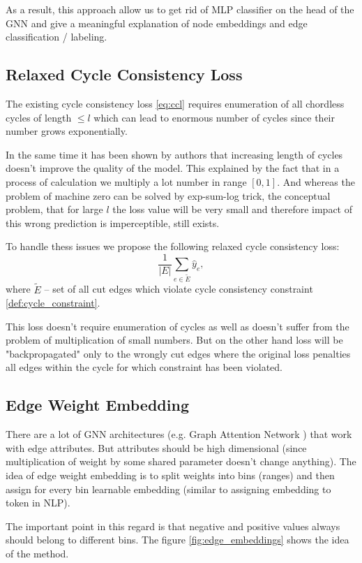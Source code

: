\documentclass[10pt, twocolumn, a4paper]{article}
\theoremstyle{definition}
\begin{document}
As a result, this approach allow us to get rid of MLP classifier on the head of the GNN and give a
meaningful explanation of node embeddings and edge classification / labeling.

\subsection{Relaxed Cycle Consistency Loss}
The existing cycle consistency loss \eqref{eq:ccl} requires enumeration of all
chordless cycles of length $\leq l$ which can lead to enormous number of cycles since
their number grows exponentially.

In the same time it has been shown by authors that increasing length of cycles
doesn't improve the quality of the model. This explained by the fact that in a process of calculation
we multiply a lot number in range $[0, 1]$. And whereas the problem of machine zero can be solved by
exp-sum-log trick, the conceptual problem, that for large $l$ the loss value will be very small and
therefore impact of this wrong prediction is imperceptible, still exists.

To handle thess issues we propose the following relaxed cycle consistency loss:
\[
    \frac{1}{|E|} \sum\limits_{e \in \tilde{E}} \hat{y}_e,
\]
where $\tilde{E}$ -- set of all cut edges which violate cycle consistency constraint \eqref{def:cycle_constraint}.

This loss doesn't require enumeration of cycles as well as doesn't suffer from the problem of
multiplication of small numbers. But on the other hand loss will be "backpropagated" only to the
wrongly cut edges where the original loss penalties all edges within the cycle for which constraint
has been violated.

\subsection{Edge Weight Embedding}

There are a lot of GNN architectures (e.g. Graph Attention Network \citet{velickovic2017graph} )
that work with edge attributes. But attributes should be high dimensional (since multiplication of
weight by some shared parameter doesn't change anything).
The idea of edge weight embedding is to split weights into
bins (ranges) and then assign for every bin learnable embedding
(similar to assigning embedding to token in NLP).

The important point in this regard is that negative and positive values always should belong
to different bins. The figure \ref{fig:edge_embeddings} shows
the idea of the method.
\end{document}
